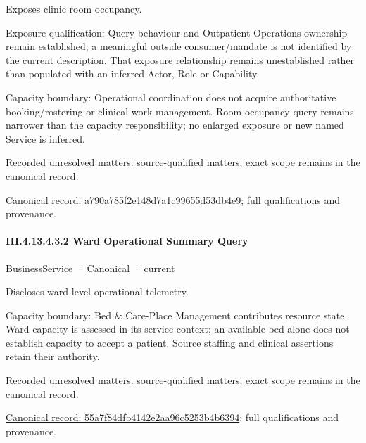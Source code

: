 Exposes clinic room occupancy.



Exposure qualification: Query behaviour and Outpatient Operations ownership remain established; a meaningful outside consumer/mandate is not identified by the current description. That exposure relationship remains unestablished rather than populated with an inferred Actor, Role or Capability.



Capacity boundary: Operational coordination does not acquire authoritative booking/rostering or clinical-work management. Room-occupancy query remains narrower than the capacity responsibility; no enlarged exposure or new named Service is inferred.


{\small Recorded unresolved matters: source-qualified matters; exact scope remains in the canonical record.}\par
{\footnotesize \href{../../../../continuum/business/business-service/a790a785f2e148d7a1c99655d53db4e9.md}{Canonical record: a790a785f2e148d7a1c99655d53db4e9}; full qualifications and provenance.}\par
\paragraph*{III.4.13.4.3.2 Ward Operational Summary Query}
\label{navigation:III.4.13.4.3.2}

\label{element:55a7f84dfb4142e2aa96c5253b4b6394}
{\small BusinessService · Canonical · current}\par

Discloses ward-level operational telemetry.



Capacity boundary: Bed \& Care-Place Management contributes resource state. Ward capacity is assessed in its service context; an available bed alone does not establish capacity to accept a patient. Source staffing and clinical assertions retain their authority.


{\small Recorded unresolved matters: source-qualified matters; exact scope remains in the canonical record.}\par
{\footnotesize \href{../../../../continuum/business/business-service/55a7f84dfb4142e2aa96c5253b4b6394.md}{Canonical record: 55a7f84dfb4142e2aa96c5253b4b6394}; full qualifications and provenance.}\par
